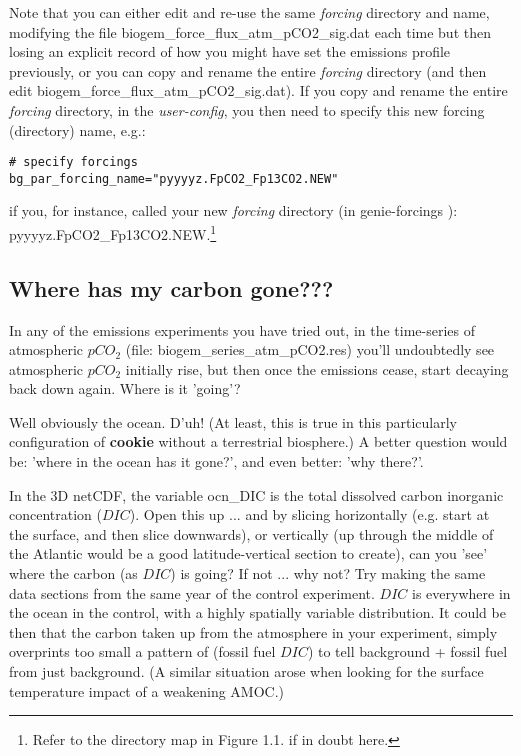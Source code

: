 Note that you can either edit and re-use the same \textit{forcing} directory and name, modifying the file \textsf{\footnotesize biogem\_force\_flux\_atm\_pCO2\_sig.dat} each time but then losing an explicit record of how you might have set the emissions profile previously, or you can copy and rename the entire \textit{forcing} directory (and then edit \textsf{\footnotesize biogem\_force\_flux\_atm\_pCO2\_sig.dat}). If you copy and rename the entire \textit{forcing} directory, in the \textit{user-config}, you then need to specify this new forcing (directory) name, e.g.:
\vspace{-2pt}\small\begin{verbatim}
# specify forcings
bg_par_forcing_name="pyyyyz.FpCO2_Fp13CO2.NEW"
\end{verbatim}\normalsize\vspace{-2pt}
if you, for instance, called your new \textit{forcing} directory (in \textsf{\footnotesize genie-forcings }): \textsf{\footnotesize pyyyyz.FpCO2\_Fp13CO2.NEW}.\footnote{Refer to the directory map in Figure 1.1. if in doubt here.}

\newpage

\subsection{Where has my carbon gone???}

In any of the emissions experiments you have tried out, in the time-series of atmospheric \(pCO_{2}\) (file: \textsf{\footnotesize biogem\_series\_atm\_pCO2.res}) you'll undoubtedly see atmospheric \(pCO_{2}\) initially rise, but then once the emissions cease, start decaying back down again. Where is it 'going'?

Well obviously the ocean. D'uh! (At least, this is true in this particularly configuration of \textbf{cookie} without a terrestrial biosphere.) A better question would be: 'where in the ocean has it gone?', and even better: 'why there?'.

In the 3D netCDF, the variable \textsf{\footnotesize ocn\_DIC} is the total dissolved carbon inorganic concentration (\(DIC\)). Open this up ... and by slicing horizontally (e.g. start at the surface, and then slice downwards), or vertically (up through the middle of the Atlantic would be a good latitude-vertical section to create), can you 'see' where the carbon (as \(DIC\)) is going? If not ... why not? Try making the same data sections from the same year of the control experiment. \(DIC\) is everywhere in the ocean in the control, with a highly spatially variable distribution. It could be then that the carbon taken up from the atmosphere in your experiment, simply overprints too small a pattern of (fossil fuel \(DIC\)) to tell background + fossil fuel from just background. (A similar situation arose when looking for the surface temperature impact of a weakening AMOC.)

